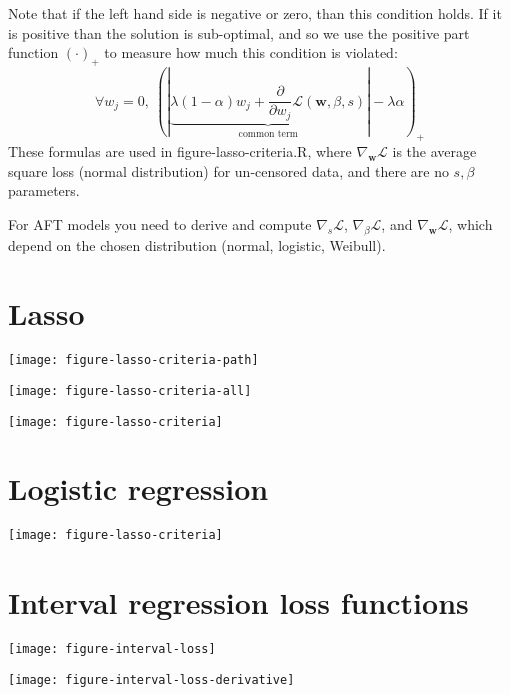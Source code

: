 \documentclass{article}
\begin{document}
Note that if the left hand side is negative or zero, than this
condition holds. If it is positive than the solution is sub-optimal,
and so we use the positive part function $(\cdot)_+$ to measure how much this
condition is violated:
\begin{equation}
  \forall w_j= 0,\ 
  (|\underbrace{\lambda(1-\alpha)w_j +
    \frac{\partial}{\partial w_j} 
  \mathcal L(\mathbf w, \beta, s)}_{\text{common term}}|
 -  \lambda\alpha)_+
\end{equation}
These formulas are used in figure-lasso-criteria.R, where
$\nabla_{\mathbf w}\mathcal L$ is the average square loss (normal
distribution) for un-censored data, and there are no $s,\beta$
parameters.

For AFT models you need to derive and compute $\nabla_{s}\mathcal L$,
$\nabla_{\beta}\mathcal L$, and $\nabla_{\mathbf w}\mathcal L$, which
depend on the chosen distribution (normal, logistic, Weibull).

\section{Lasso}

\texttt{[image: figure-lasso-criteria-path]}

\texttt{[image: figure-lasso-criteria-all]}

\texttt{[image: figure-lasso-criteria]}

\section{Logistic regression}

\texttt{[image: figure-lasso-criteria]}

\section{Interval regression loss functions}
\texttt{[image: figure-interval-loss]}

\texttt{[image: figure-interval-loss-derivative]}
\end{document}
